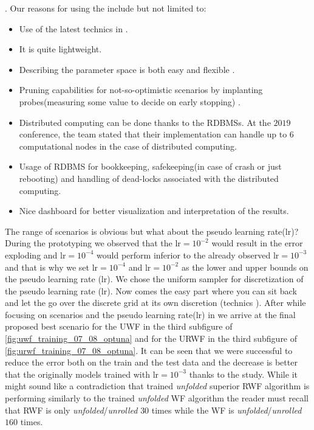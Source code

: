 \optuna\cite{Akiba2019}\index{\optuna}. Our reasons for using the \optuna\cite{Akiba2019}\index{\optuna} include but not limited to:
\begin{itemize}
  \item Use of the latest technics in \ho\cite{Hutter2019}\cite{Akiba2019}\index{\ho}.
  \item It is quite lightweight.
  \item Describing the parameter space is both easy and flexible \cite{Akiba2019}.
  \item Pruning capabilities for not-so-optimistic scenarios by implanting probes(measuring some value to decide on early stopping) \cite{Akiba2019}.
  \item Distributed computing can be done thanks to the \ac{RDBMS}s. At the $2019$ \scipy conference, the \optuna team stated that their implementation can handle up to $6$ computational nodes in the case of distributed computing.
  \item Usage of \ac{RDBMS} for bookkeeping, safekeeping(in case of crash or just rebooting) and handling of dead-locks associated with the distributed computing.
  \item Nice dashboard for better visualization and interpretation of the results.  
\end{itemize}
The range of scenarios is obvious but what about the pseudo learning rate($\mathrm{lr}$)? 
During the prototyping we observed that the $\mathrm{lr}=10^{-2}$ would result in the error exploding and $\mathrm{lr}=10^{-4}$ would perform 
inferior to the already observed $\mathrm{lr}=10^{-3}$ and that is why we set $\mathrm{lr}=10^{-4}$ and $\mathrm{lr}=10^{-2}$ 
as the lower and upper bounds on the pseudo learning rate ($\mathrm{lr}$). We chose the uniform sampler for discretization of the pseudo learning rate ($\mathrm{lr}$). 
Now comes the easy part where you can sit back and let the \optuna\cite{Akiba2019} go over the discrete grid at its own discretion (\ho technics \cite{Hutter2019}\cite{Akiba2019}).
After \ho\cite{Hutter2019}\cite{Akiba2019}\index{\ho} while focusing on scenarios and the pseudo learning rate($\mathrm{lr}$) in \adam\cite{Kingma2014} 
we arrive at the final proposed best scenario for the \ac{UWF} in the third subfigure of \cref{fig:uwf_training_07_08_optuna} and for the 
\ac{URWF} in the third subfigure of \cref{fig:urwf_training_07_08_optuna}. It can be seen that we were successful to reduce the error both on the train and the test data and the decrease is better that the originally models trained with $\mathrm{lr}=10^{-3}$ 
thanks to the \ho study. While it might sound like a contradiction that trained \emph{unfolded} superior \ac{RWF} algorithm
is performing similarly to the trained \emph{unfolded} \ac{WF} algorithm the reader must recall that \ac{RWF} is only \emph{unfolded}/\emph{unrolled} $30$ times while 
the \ac{WF} is \emph{unfolded}/\emph{unrolled} $160$ times. 


